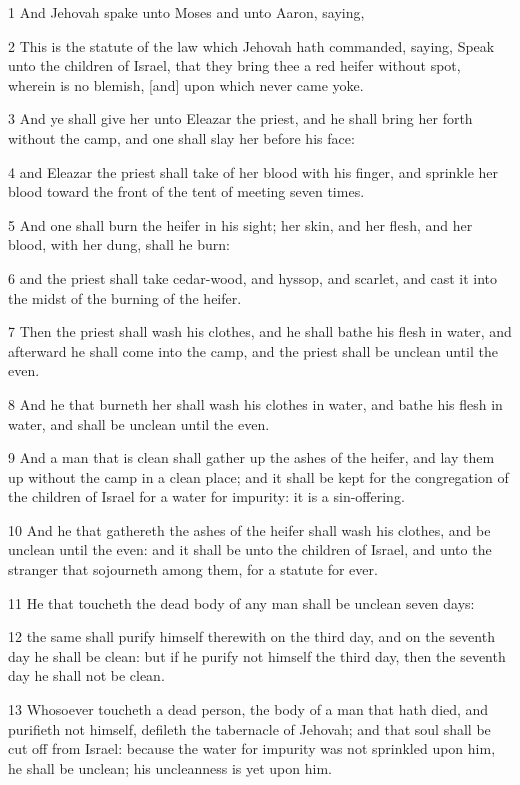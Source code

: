 \par 1 And Jehovah spake unto Moses and unto Aaron, saying,
\par 2 This is the statute of the law which Jehovah hath commanded, saying, Speak unto the children of Israel, that they bring thee a red heifer without spot, wherein is no blemish, [and] upon which never came yoke.
\par 3 And ye shall give her unto Eleazar the priest, and he shall bring her forth without the camp, and one shall slay her before his face:
\par 4 and Eleazar the priest shall take of her blood with his finger, and sprinkle her blood toward the front of the tent of meeting seven times.
\par 5 And one shall burn the heifer in his sight; her skin, and her flesh, and her blood, with her dung, shall he burn:
\par 6 and the priest shall take cedar-wood, and hyssop, and scarlet, and cast it into the midst of the burning of the heifer.
\par 7 Then the priest shall wash his clothes, and he shall bathe his flesh in water, and afterward he shall come into the camp, and the priest shall be unclean until the even.
\par 8 And he that burneth her shall wash his clothes in water, and bathe his flesh in water, and shall be unclean until the even.
\par 9 And a man that is clean shall gather up the ashes of the heifer, and lay them up without the camp in a clean place; and it shall be kept for the congregation of the children of Israel for a water for impurity: it is a sin-offering.
\par 10 And he that gathereth the ashes of the heifer shall wash his clothes, and be unclean until the even: and it shall be unto the children of Israel, and unto the stranger that sojourneth among them, for a statute for ever.
\par 11 He that toucheth the dead body of any man shall be unclean seven days:
\par 12 the same shall purify himself therewith on the third day, and on the seventh day he shall be clean: but if he purify not himself the third day, then the seventh day he shall not be clean.
\par 13 Whosoever toucheth a dead person, the body of a man that hath died, and purifieth not himself, defileth the tabernacle of Jehovah; and that soul shall be cut off from Israel: because the water for impurity was not sprinkled upon him, he shall be unclean; his uncleanness is yet upon him.
